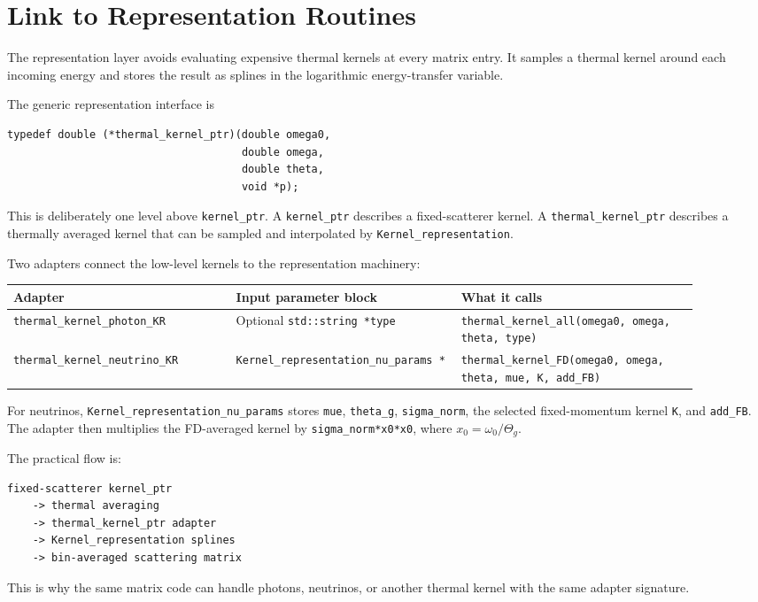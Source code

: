 \documentclass[11pt]{article}
\begin{document}
\section{Link to Representation Routines}

The representation layer avoids evaluating expensive thermal kernels at every
matrix entry. It samples a thermal kernel around each incoming energy and stores
the result as splines in the logarithmic energy-transfer variable.

The generic representation interface is
\begin{verbatim}
typedef double (*thermal_kernel_ptr)(double omega0,
                                     double omega,
                                     double theta,
                                     void *p);
\end{verbatim}
This is deliberately one level above \texttt{kernel\_ptr}. A
\texttt{kernel\_ptr} describes a fixed-scatterer kernel. A
\texttt{thermal\_kernel\_ptr} describes a thermally averaged kernel that can be
sampled and interpolated by \texttt{Kernel\_representation}.

Two adapters connect the low-level kernels to the representation machinery:
\begin{center}
\small
\begin{tabular}{L{0.30\linewidth}L{0.28\linewidth}L{0.32\linewidth}}
\toprule
Adapter & Input parameter block & What it calls \\
\midrule
\texttt{thermal\_kernel\_photon\_KR} & Optional \texttt{std::string *type} & \texttt{thermal\_kernel\_all(omega0, omega, theta, type)} \\
\texttt{thermal\_kernel\_neutrino\_KR} & \texttt{Kernel\_representation\_nu\_params *} & \texttt{thermal\_kernel\_FD(omega0, omega, theta, mue, K, add\_FB)} \\
\bottomrule
\end{tabular}
\end{center}

For neutrinos, \texttt{Kernel\_representation\_nu\_params} stores
\texttt{mue}, \texttt{theta\_g}, \texttt{sigma\_norm}, the selected
fixed-momentum kernel \texttt{K}, and \texttt{add\_FB}. The adapter then
multiplies the FD-averaged kernel by \texttt{sigma\_norm*x0*x0}, where
$x_0=\omega_0/\Theta_g$.

The practical flow is:
\begin{verbatim}
fixed-scatterer kernel_ptr
    -> thermal averaging
    -> thermal_kernel_ptr adapter
    -> Kernel_representation splines
    -> bin-averaged scattering matrix
\end{verbatim}
This is why the same matrix code can handle photons, neutrinos, or another
thermal kernel with the same adapter signature.
\end{document}

